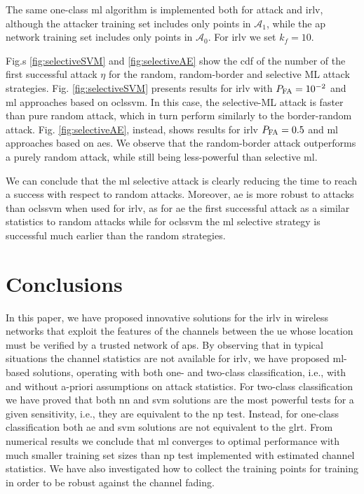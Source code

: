 \documentclass[draftcls,onecolumn,12pt]{IEEEtran}
\begin{document}
The same one-class \ac{ml} algorithm is implemented both for attack and \ac{irlv}, although the attacker training set includes only points in $\mathcal A_1$, while the \ac{ap} network training set includes only  points in $\mathcal A_0$. For  \ac{irlv}  we set $k_f=10$.

Fig.s \ref{fig:selectiveSVM} and \ref{fig:selectiveAE} show the \ac{cdf} of the number of the first successful attack $\eta$ for the random, random-border and selective ML attack strategies. Fig. \ref{fig:selectiveSVM} presents results for \ac{irlv} with $P_{\rm FA}=10^{-2}$ and \ac{ml} approaches based on \ac{oclssvm}. In this case, the selective-ML attack is faster than pure random attack, which in turn perform similarly to the border-random  attack.  Fig. \ref{fig:selectiveAE}, instead, shows results for  \ac{irlv} $P_{\rm FA} =0.5$ and \ac{ml} approaches based on \acp{ae}. We observe that the random-border attack outperforms a purely random attack, while still being less-powerful than selective \ac{ml}. 

We can conclude that the \ac{ml} selective attack is clearly reducing the time to reach a success with respect to random attacks. Moreover, \ac{ae} is more robust to attacks than \ac{oclssvm} when used for \ac{irlv}, as for \ac{ae} the first successful attack as a similar statistics to random attacks while for \ac{oclssvm} the \ac{ml} selective strategy is  successful much earlier than the random strategies. 



\section{Conclusions}

In this paper, we have proposed innovative solutions for the \ac{irlv} in wireless networks that exploit the features of the channels between the \ac{ue} whose location must be verified by a trusted network of \acp{ap}. By observing that in typical situations the channel statistics are not available for \ac{irlv}, we have proposed \ac{ml}-based solutions, operating with both one- and two-class classification, i.e., with and without a-priori assumptions on attack statistics. For two-class classification we have proved that  both \ac{nn} and \ac{svm} solutions  are the most powerful tests for a given sensitivity, i.e., they are equivalent to the \ac{np} test. Instead, for one-class classification both \ac{ae} and \ac{svm} solutions are not equivalent to the \ac{glrt}. From numerical results we conclude that \ac{ml} converges to optimal performance with much smaller training set sizes than \ac{np} test implemented with estimated channel statistics. We have also investigated how to collect the training points for training in order to be robust against the channel fading.
\end{document}
